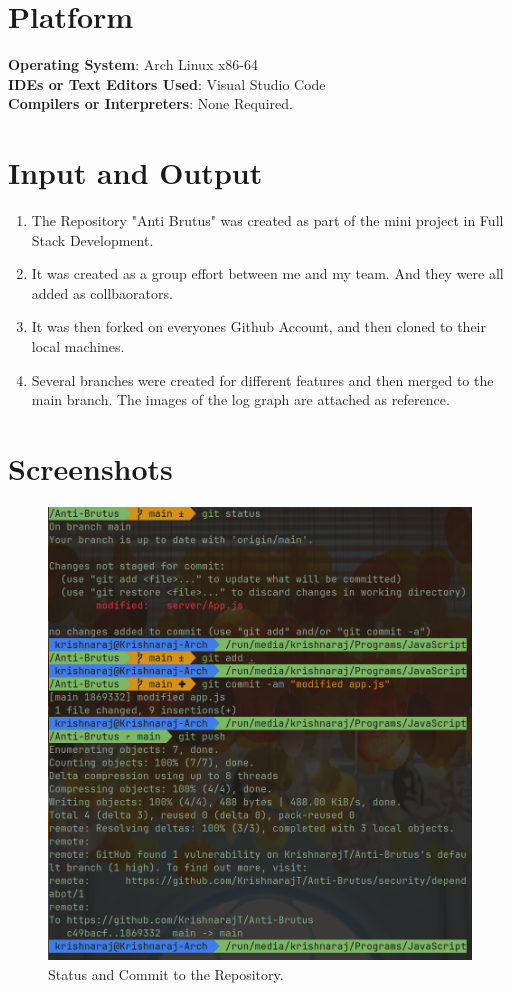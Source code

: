 \documentclass[11pt]{article}
\begin{document}
\section{Platform}
\textbf{Operating System}: Arch Linux x86-64 \\
\textbf{IDEs or Text Editors Used}: Visual Studio Code\\
\textbf{Compilers or Interpreters}: None Required. \\

\section{Input and Output}

\begin{enumerate}
    \item The Repository "Anti Brutus" was created as part of the mini project in Full Stack Development.
    \item It was created as a group effort between me and my team. And they were all added as collbaorators. 
    \item It was then forked on everyones Github Account, and then cloned to their local machines.
    \item Several branches were created for different features and then merged to the main branch. The images of the log graph are attached as reference. 
\end{enumerate}

\section{Screenshots}
\begin{figure}[H]
    \centering
    \includegraphics[width=.95\textwidth]{6.png}
    \caption{Status and Commit to the Repository. }
\end{figure}
\end{document}
